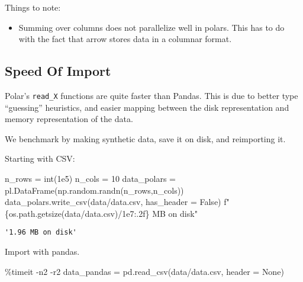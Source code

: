 \documentclass[
  letterpaper,
  DIV=11,
  numbers=noendperiod]{scrartcl}
\newenvironment{Shaded}{\begin{snugshade}}{\end{snugshade}}
\newcommand{\BuiltInTok}[1]{\textcolor[rgb]{0.00,0.23,0.31}{#1}}
\newcommand{\DecValTok}[1]{\textcolor[rgb]{0.68,0.00,0.00}{#1}}
\newcommand{\FloatTok}[1]{\textcolor[rgb]{0.68,0.00,0.00}{#1}}
\newcommand{\NormalTok}[1]{\textcolor[rgb]{0.00,0.23,0.31}{#1}}
\newcommand{\OperatorTok}[1]{\textcolor[rgb]{0.37,0.37,0.37}{#1}}
\newcommand{\SpecialCharTok}[1]{\textcolor[rgb]{0.37,0.37,0.37}{#1}}
\newcommand{\SpecialStringTok}[1]{\textcolor[rgb]{0.13,0.47,0.30}{#1}}
\newcommand{\StringTok}[1]{\textcolor[rgb]{0.13,0.47,0.30}{#1}}
\newcommand{\VariableTok}[1]{\textcolor[rgb]{0.07,0.07,0.07}{#1}}
\providecommand{\tightlist}{%
  \setlength{\itemsep}{0pt}\setlength{\parskip}{0pt}}\usepackage{longtable,booktabs,array}
\begin{document}
Things to note:

\begin{itemize}
\tightlist
\item
  Summing over columns does not parallelize well in polars. This has to
  do with the fact that arrow stores data in a columnar format.
\end{itemize}

\hypertarget{speed-of-import}{%
\subsection{Speed Of Import}\label{speed-of-import}}

Polar's \texttt{read\_X} functions are quite faster than Pandas. This is
due to better type ``guessing'' heuristics, and easier mapping between
the disk representation and memory representation of the data.

We benchmark by making synthetic data, save it on disk, and reimporting
it.

Starting with CSV:

\begin{Shaded}
\begin{Highlighting}[]
\NormalTok{n\_rows }\OperatorTok{=} \BuiltInTok{int}\NormalTok{(}\FloatTok{1e5}\NormalTok{)}
\NormalTok{n\_cols }\OperatorTok{=} \DecValTok{10}
\NormalTok{data\_polars }\OperatorTok{=}\NormalTok{ pl.DataFrame(np.random.randn(n\_rows,n\_cols))}
\NormalTok{data\_polars.write\_csv(}\StringTok{\textquotesingle{}data/data.csv\textquotesingle{}}\NormalTok{, has\_header }\OperatorTok{=} \VariableTok{False}\NormalTok{)}
\SpecialStringTok{f"}\SpecialCharTok{\{}\NormalTok{os}\SpecialCharTok{.}\NormalTok{path}\SpecialCharTok{.}\NormalTok{getsize(}\StringTok{\textquotesingle{}data/data.csv\textquotesingle{}}\NormalTok{)}\OperatorTok{/}\FloatTok{1e7}\SpecialCharTok{:.2f\}}\SpecialStringTok{ MB on disk"}
\end{Highlighting}
\end{Shaded}

\begin{verbatim}
'1.96 MB on disk'
\end{verbatim}

Import with pandas.

\begin{Shaded}
\begin{Highlighting}[]
\OperatorTok{\%}\NormalTok{timeit }\OperatorTok{{-}}\NormalTok{n2 }\OperatorTok{{-}}\NormalTok{r2 data\_pandas }\OperatorTok{=}\NormalTok{ pd.read\_csv(}\StringTok{\textquotesingle{}data/data.csv\textquotesingle{}}\NormalTok{, header }\OperatorTok{=} \VariableTok{None}\NormalTok{)}
\end{Highlighting}
\end{Shaded}
\end{document}
